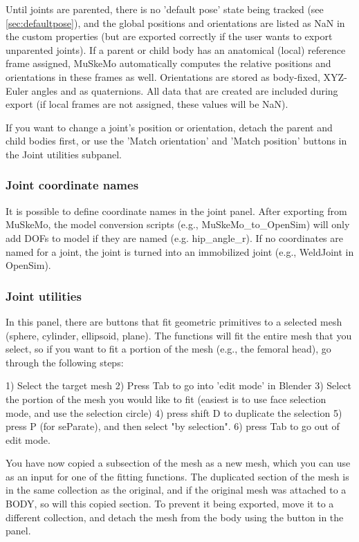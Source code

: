 \documentclass{article}
\begin{document}
Until joints are parented, there is no 'default pose' state being tracked (see \ref{sec:defaultpose}), and the global positions and orientations are listed as NaN in the custom properties (but are exported correctly if the user wants to export unparented joints). If a parent or child body has an anatomical (local) reference frame assigned, MuSkeMo automatically computes the relative positions and orientations in these frames as well. Orientations are stored as body-fixed, XYZ-Euler angles and as quaternions. All data that are created are included during export (if local frames are not assigned, these values will be NaN).

If you want to change a joint's position or orientation, detach the parent and child bodies first, or use the 'Match orientation' and 'Match position' buttons in the Joint utilities subpanel.

\subsubsection*{Joint coordinate names}

It is possible to define coordinate names in the joint panel. After exporting from MuSkeMo, the model conversion scripts (e.g., MuSkeMo\_to\_OpenSim) will only add DOFs to model if they are named (e.g. hip\_angle\_r). If no coordinates are named for a joint, the joint is turned into an immobilized joint (e.g., WeldJoint in OpenSim). 

\subsubsection*{Joint utilities}

In this panel, there are buttons that fit geometric primitives to a selected mesh (sphere, cylinder, ellipsoid, plane). The functions will fit the entire mesh that you select, so if you want to fit a portion of the mesh (e.g., the femoral head), go through the following steps:

1) Select the target mesh
2) Press Tab to go into 'edit mode' in Blender
3) Select the portion of the mesh you would like to fit (easiest is to use face selection mode, and use the selection circle)
4) press shift \+ D to duplicate the selection
5) press P (for seParate), and then select "by selection".
6) press Tab to go out of edit mode.

You have now copied a subsection of the mesh as a new mesh, which you can use as an input for one of the fitting functions. The duplicated section of the mesh is in the same collection as the original, and if the original mesh was attached to a BODY, so will this copied section. To prevent it being exported, move it to a different collection, and detach the mesh from the body using the button in the panel.
\end{document}
